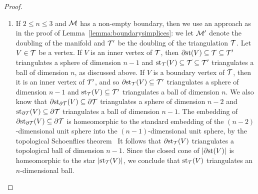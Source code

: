\documentclass[10pt,a4paper]{article}
\begin{document}
\begin{proof}
\begin{enumerate}
    \item 
    If $2 \leq n \leq 3$ and ${\mathcal M}$ has a non-empty boundary, then we use an approach as in the proof of Lemma~\ref{lemma:boundarysimplices}: 
    we let ${\mathcal M}'$ denote the doubling of the manifold and ${\mathcal T}'$ be the doubling of the triangulation ${\mathcal T}$. 
    Let $V \in {\mathcal T}$ be a vertex. 
    If $V$ is an inner vertex of ${\mathcal T}$, then ${\partial \rm st}(V) \subseteq {\mathcal T} \subseteq {\mathcal T}'$ triangulates a sphere of dimension $n-1$ and $\operatorname{st}_{{\mathcal T}}(V) \subseteq {\mathcal T} \subseteq {\mathcal T}'$ triangulates a ball of dimension $n$, as discussed above. 
    If $V$ is a boundary vertex of ${\mathcal T}$, then it is an inner vertex of ${\mathcal T}'$,
    and so ${\partial \rm st}_{{\mathcal T}}(V) \subseteq {\mathcal T}'$ triangulates a sphere of dimension $n-1$ and $\operatorname{st}_{{\mathcal T}}(V) \subseteq {\mathcal T}'$ triangulates a ball of dimension $n$.
    We also know that ${\partial \rm st}_{\partial{\mathcal T}}(V) \subseteq \partial{\mathcal T}$ triangulates a sphere of dimension $n-2$ and $\operatorname{st}_{\partial{\mathcal T}}(V) \subseteq \partial{\mathcal T}$ triangulates a ball of dimension $n-1$. 
    The embedding of ${\partial \rm st}_{\partial{\mathcal T}}(V) \subseteq \partial{\mathcal T}$ is homeomorphic to the standard embedding of the $(n-2)$-dimensional unit sphere into the $(n-1)$-dimensional unit sphere,
    by the topological Schoenflies theorem~\cite{Moise1977geometric}
    It follows that ${\partial \rm st}_{{\mathcal T}}(V)$ triangulates a topological ball of dimension $n-1$.
    Since the closed cone of $\left| {\partial \rm st}(V) \right|$ is homeomorphic to the star $\left| \operatorname{st}_{{\mathcal T}}(V) \right|$, we conclude that $\operatorname{st}_{{\mathcal T}}(V)$ triangulates an $n$-dimensional ball. 
    

\end{enumerate}
\end{proof}
\end{document}

